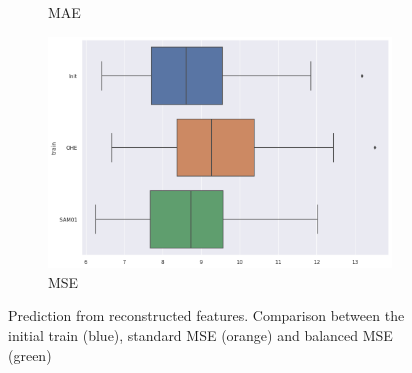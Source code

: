 \documentclass{article}
\theoremstyle{definition}
\begin{document}
\begin{figure}[H]
\begin{subfigure}[b]{0.49\textwidth}
         \caption{MAE}
         \quad
         \includegraphics[width=\textwidth]{imgs/Student/boxplot_MSE.png}
         \caption{MSE}
     \end{subfigure}
     \caption{Prediction from reconstructed features. Comparison between the initial train (blue), standard MSE (orange) and balanced MSE (green)}
\end{figure}
\end{document}
